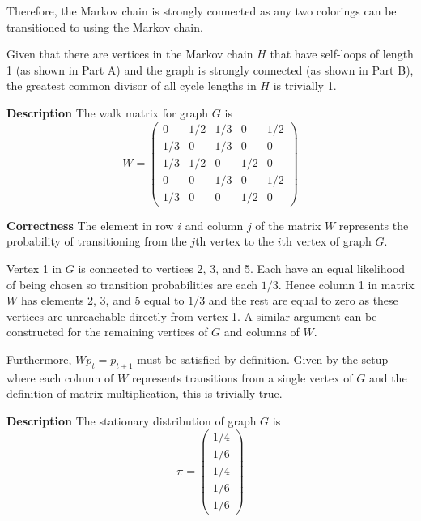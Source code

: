\documentclass[12pt,twoside]{article}
\begin{document}
\begin{problems}
\begin{problemparts}
Therefore, the Markov chain is strongly connected as any two colorings can be
transitioned to using the Markov chain.

\problempart %

Given that there are vertices in the Markov chain $H$ that have self-loops of
length 1 (as shown in Part A) and the graph is strongly connected (as shown
in Part B), the greatest common divisor of all cycle lengths in $H$ is
trivially 1.

\end{problemparts}

\newpage
\problem  %

\begin{problemparts}

\problempart %

{\bf Description} The walk matrix for graph $G$ is
$$ W = \begin{pmatrix}
    0 & 1/2 & 1/3 &   0 & 1/2 \\
  1/3 &   0 & 1/3 &   0 &   0 \\
  1/3 & 1/2 &   0 & 1/2 &   0 \\
    0 &   0 & 1/3 &   0 & 1/2 \\
  1/3 &   0 &   0 & 1/2 &   0
\end{pmatrix} $$

{\bf Correctness} The element in row $i$ and column $j$ of the matrix $W$
represents the probability of transitioning from the $j$th vertex to the
$i$th vertex of graph $G$.

Vertex 1 in $G$ is connected to vertices 2, 3, and 5. Each have an equal
likelihood of being chosen so transition probabilities are each $1/3$. Hence
column 1 in matrix $W$ has elements 2, 3, and 5 equal to $1/3$ and the rest
are equal to zero as these vertices are unreachable directly from vertex 1. A
similar argument can be constructed for the remaining vertices of $G$ and
columns of $W$.

Furthermore, $W p_t = p_{t + 1}$ must be satisfied by definition. Given by
the setup where each column of $W$ represents transitions from a single
vertex of $G$ and the definition of matrix multiplication, this is trivially
true.

\problempart %

{\bf Description} The stationary distribution of graph $G$ is
$$ \pi = \begin{pmatrix}
  1/4 \\
  1/6 \\
  1/4 \\
  1/6 \\
  1/6
\end{pmatrix} $$


\end{problemparts}
\end{problems}
\end{document}
